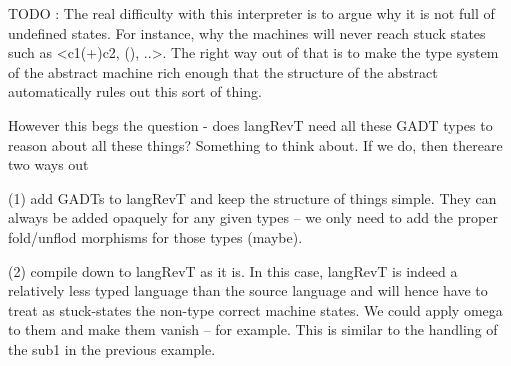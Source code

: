 \documentclass{llncs}
\begin{document}
\begin{center}
\end{center}



TODO : The real difficulty with this interpreter is to argue why it is
not full of undefined states. For instance, why the machines will
never reach stuck states such as {{<c1(+)c2, (), ..>}}.  The right way
out of that is to make the type system of the abstract machine rich
enough that the structure of the abstract automatically rules out this
sort of thing. 

%
%
%


However this begs the question - does {{langRevT}} need all these GADT
types to reason about all these things? Something to think about. If
we do, then thereare two ways out 

(1) add GADTs to {{langRevT}} and keep the structure of things
simple. They can always be added opaquely for any given types -- we
only need to add the proper fold/unflod morphisms for those types
(maybe).

(2) compile down to {{langRevT}} as it is. In this case, {{langRevT}}
is indeed a relatively less typed language than the source language
and will hence have to treat as stuck-states the non-type correct
machine states. We could apply omega to them and make them vanish --
for example. This is similar to the handling of the {{sub1}} in the
previous example. 



 

\end{document}
